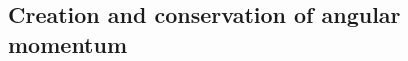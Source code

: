 \documentclass{article}
\newtheorem{lemma}[theorem]{Lemma}
\theoremstyle{remark}
\begin{document}
\subsection{Creation and conservation of angular momentum}


\end{document}
